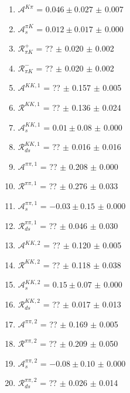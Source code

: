 \begin{enumerate}
\item $\mathcal{A}^{K\pi}$ = $0.046 \pm 0.027$ $\pm$ 0.007
\item $\mathcal{A}_s^{\pi K}$ = $0.012 \pm 0.017$ $\pm$ 0.000
\item $\mathcal{R}_{\pi K}^+$ = ?? $\pm$ 0.020 $\pm$ 0.002
\item $\mathcal{R}_{\pi K}^-$ = ?? $\pm$ 0.020 $\pm$ 0.002
\item $\mathcal{A}^{KK,1}$ = ?? $\pm$ 0.157 $\pm$ 0.005
\item $\mathcal{R}^{KK,1}$ = ?? $\pm$ 0.136 $\pm$ 0.024
\item $\mathcal{A}_s^{KK,1}$ = $0.01 \pm 0.08$ $\pm$ 0.000
\item $\mathcal{R}_{ds}^{KK,1}$ = ?? $\pm$ 0.016 $\pm$ 0.016
\item $\mathcal{A}^{\pi\pi,1}$ = ?? $\pm$ 0.208 $\pm$ 0.000
\item $\mathcal{R}^{\pi\pi,1}$ = ?? $\pm$ 0.276 $\pm$ 0.033
\item $\mathcal{A}_s^{\pi\pi,1}$ = $-0.03 \pm 0.15$ $\pm$ 0.000
\item $\mathcal{R}_{ds}^{\pi\pi,1}$ = ?? $\pm$ 0.046 $\pm$ 0.030
\item $\mathcal{A}^{KK,2}$ = ?? $\pm$ 0.120 $\pm$ 0.005
\item $\mathcal{R}^{KK,2}$ = ?? $\pm$ 0.118 $\pm$ 0.038
\item $\mathcal{A}_s^{KK,2}$ = $0.15 \pm 0.07$ $\pm$ 0.000
\item $\mathcal{R}_{ds}^{KK,2}$ = ?? $\pm$ 0.017 $\pm$ 0.013
\item $\mathcal{A}^{\pi\pi,2}$ = ?? $\pm$ 0.169 $\pm$ 0.005
\item $\mathcal{R}^{\pi\pi,2}$ = ?? $\pm$ 0.209 $\pm$ 0.050
\item $\mathcal{A}_s^{\pi\pi,2}$ = $-0.08 \pm 0.10$ $\pm$ 0.000
\item $\mathcal{R}_{ds}^{\pi\pi,2}$ = ?? $\pm$ 0.026 $\pm$ 0.014
\end{enumerate}
